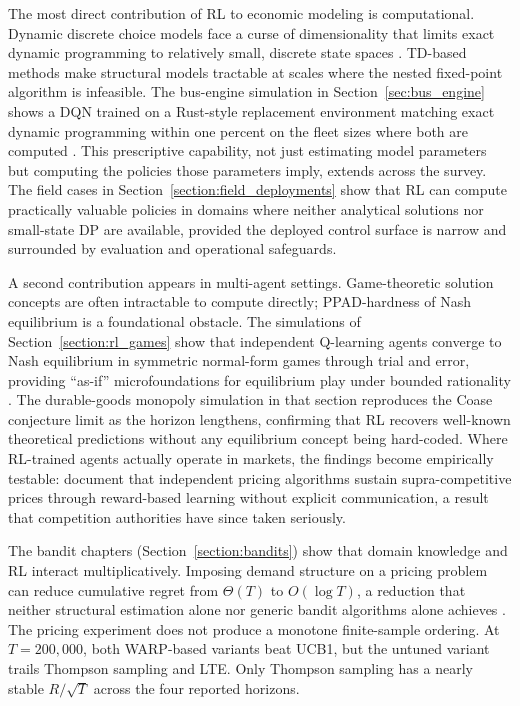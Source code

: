 The most direct contribution of RL to economic modeling is computational.
Dynamic discrete choice models face a curse of dimensionality that limits exact dynamic programming to relatively small, discrete state spaces \citep{rust2008dp}.
TD-based methods make structural models tractable at scales where the nested fixed-point algorithm is infeasible. The bus-engine simulation in Section~\ref{sec:bus_engine} shows a DQN trained on a Rust-style replacement environment matching exact dynamic programming within one percent on the fleet sizes where both are computed \citep{Rust1987}.
This prescriptive capability, not just estimating model parameters but computing the policies those parameters imply, extends across the survey.
The field cases in Section~\ref{section:field_deployments} show that RL can compute practically valuable policies in domains where neither analytical solutions nor small-state DP are available, provided the deployed control surface is narrow and surrounded by evaluation and operational safeguards.

A second contribution appears in multi-agent settings.
Game-theoretic solution concepts are often intractable to compute directly; PPAD-hardness of Nash equilibrium \citep{Shapley1964} is a foundational obstacle.
The simulations of Section~\ref{section:rl_games} show that independent Q-learning agents converge to Nash equilibrium in symmetric normal-form games through trial and error, providing ``as-if'' microfoundations for equilibrium play under bounded rationality \citep{FudenbergLevine1998}.
The durable-goods monopoly simulation in that section reproduces the Coase conjecture limit as the horizon lengthens, confirming that RL recovers well-known theoretical predictions without any equilibrium concept being hard-coded.
Where RL-trained agents actually operate in markets, the findings become empirically testable: \citet{Calvano2020} document that independent pricing algorithms sustain supra-competitive prices through reward-based learning without explicit communication, a result that competition authorities have since taken seriously.

The bandit chapters (Section~\ref{section:bandits}) show that domain knowledge and RL interact multiplicatively.
Imposing demand structure on a pricing problem can reduce cumulative regret from $\Theta(T)$ to $O(\log T)$, a reduction that neither structural estimation alone nor generic bandit algorithms alone achieves \citep{Agrawal2024ref}.
The pricing experiment does not produce a monotone finite-sample ordering. At $T=200{,}000$, both WARP-based variants beat UCB1, but the untuned variant trails Thompson sampling and LTE. Only Thompson sampling has a nearly stable $R/\sqrt{T}$ across the four reported horizons.

